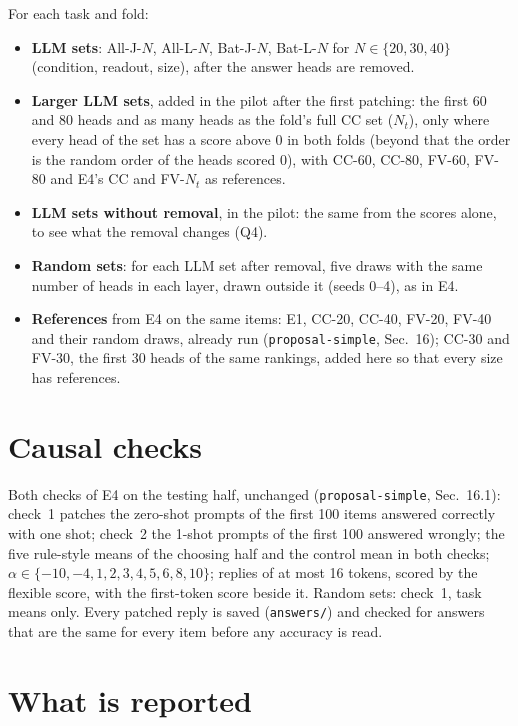 \documentclass[11pt,a4paper]{article}
\newcommand{\simple}[1]{\texttt{proposal-simple}, #1}
\begin{document}
For each task and fold:
\begin{itemize}
  \item \textbf{LLM sets}: All-J-$N$, All-L-$N$, Bat-J-$N$, Bat-L-$N$ for $N\in\{20,30,40\}$ (condition, readout, size), after the answer heads are removed.
  \item \textbf{Larger LLM sets}, added in the pilot after the first patching: the first 60 and 80 heads and as many heads as the fold's full CC set ($N_t$), only where every head of the set has a score above 0 in both folds (beyond that the order is the random order of the heads scored 0), with CC-60, CC-80, FV-60, FV-80 and E4's CC and FV-$N_t$ as references.
  \item \textbf{LLM sets without removal}, in the pilot: the same from the scores alone, to see what the removal changes (Q4).
  \item \textbf{Random sets}: for each LLM set after removal, five draws with the same number of heads in each layer, drawn outside it (seeds 0--4), as in E4.
  \item \textbf{References} from E4 on the same items: E1, CC-20, CC-40, FV-20, FV-40 and their random draws, already run (\simple{Sec.~16}); CC-30 and FV-30, the first 30 heads of the same rankings, added here so that every size has references.
\end{itemize}

\section{Causal checks}\label{sec:checks}

Both checks of E4 on the testing half, unchanged (\simple{Sec.~16.1}): check~1 patches the zero-shot prompts of the first 100 items answered correctly with one shot; check~2 the 1-shot prompts of the first 100 answered wrongly; the five rule-style means of the choosing half and the control mean in both checks; $\alpha \in \{-10, -4, 1, 2, 3, 4, 5, 6, 8, 10\}$; replies of at most 16 tokens, scored by the flexible score, with the first-token score beside it. Random sets: check~1, task means only. Every patched reply is saved (\texttt{answers/}) and checked for answers that are the same for every item before any accuracy is read.

\section{What is reported}\label{sec:report}
\end{document}
